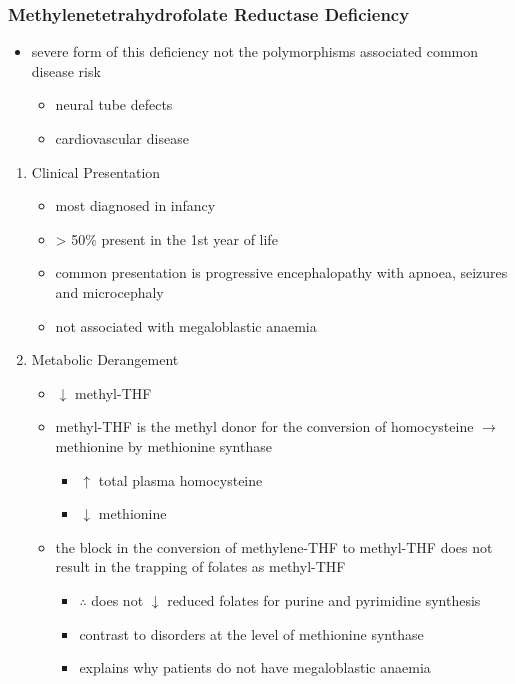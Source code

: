 \documentclass{scrartcl}
\begin{document}
\subsubsection{Methylenetetrahydrofolate Reductase Deficiency}
\label{sec:org98bfb83}
\begin{itemize}
\item severe form of this deficiency not the polymorphisms associated
common disease risk
\begin{itemize}
\item neural tube defects
\item cardiovascular disease
\end{itemize}
\end{itemize}
\begin{enumerate}
\item Clinical Presentation
\label{sec:orge1a8f87}
\begin{itemize}
\item most diagnosed in infancy
\item \textgreater{} 50\% present in the 1st year of life
\item common presentation is progressive encephalopathy with apnoea,
seizures and microcephaly
\item not associated with megaloblastic anaemia
\end{itemize}

\item Metabolic Derangement
\label{sec:org0858da2}
\begin{itemize}
\item \(\downarrow\) methyl-THF
\item methyl-THF is the methyl donor for the conversion of homocysteine
\(\to\) methionine by methionine synthase
\begin{itemize}
\item \(\uparrow\) total plasma homocysteine
\item \(\downarrow\) methionine
\end{itemize}
\item the block in the conversion of methylene-THF to methyl-THF does not
result in the trapping of folates as methyl-THF
\begin{itemize}
\item \(\therefore\) does not \(\downarrow\) reduced folates for purine and
pyrimidine synthesis
\item contrast to disorders at the level of methionine synthase
\item explains why patients do not have megaloblastic anaemia
\end{itemize}
\end{itemize}


\end{enumerate}
\end{document}
